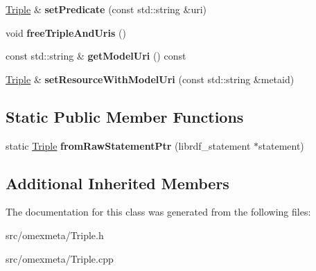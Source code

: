 \begin{DoxyCompactItemize}
\hyperlink{classomexmeta_1_1Triple}{Triple} \& {\bfseries set\+Predicate} (const std\+::string \&uri)
\item 
\mbox{\label{classomexmeta_1_1Triple_ab89993902b551b98d9e17e4fe5ebed6b}} 
void {\bfseries free\+Triple\+And\+Uris} ()
\item 
\mbox{\label{classomexmeta_1_1Triple_ac379e5410a41c1946e91d581f023c7f5}} 
const std\+::string \& {\bfseries get\+Model\+Uri} () const
\item 
\mbox{\label{classomexmeta_1_1Triple_a44d31389b0056ab4f1d8689521a25032}} 
\hyperlink{classomexmeta_1_1Triple}{Triple} \& {\bfseries set\+Resource\+With\+Model\+Uri} (const std\+::string \&metaid)
\end{DoxyCompactItemize}
\subsection*{Static Public Member Functions}
\begin{DoxyCompactItemize}
\item 
\mbox{\label{classomexmeta_1_1Triple_af03c0ce3392c0ff30f13772209ac873c}} 
static \hyperlink{classomexmeta_1_1Triple}{Triple} {\bfseries from\+Raw\+Statement\+Ptr} (librdf\+\_\+statement $\ast$statement)
\end{DoxyCompactItemize}
\subsection*{Additional Inherited Members}


The documentation for this class was generated from the following files\+:\begin{DoxyCompactItemize}
\item 
src/omexmeta/Triple.\+h\item 
src/omexmeta/Triple.\+cpp\end{DoxyCompactItemize}
